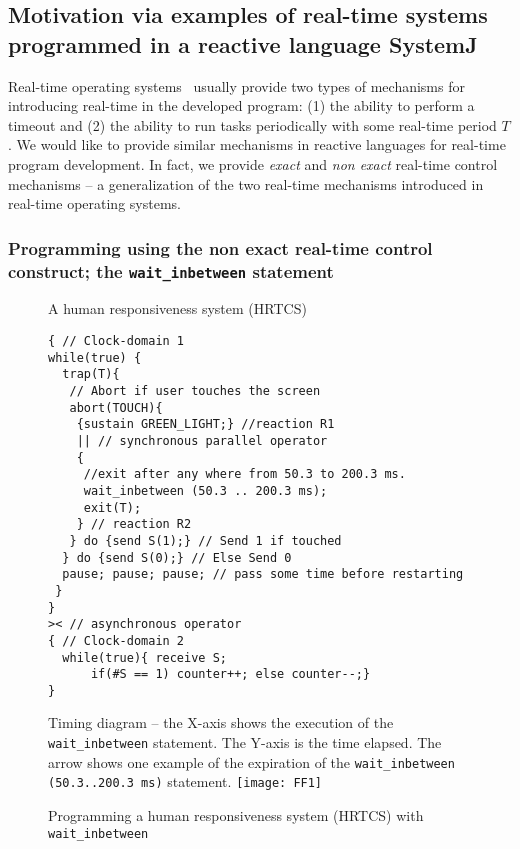 \subsection{Motivation via examples of real-time systems programmed in a
reactive language SystemJ}
\label{sec:motivating-example}


Real-time operating systems~\cite{barry2009using} usually provide two
types of mechanisms for introducing real-time in the developed program:
(1) the ability to perform a timeout and (2) the ability to run tasks
periodically with some real-time period $T$. We would like to provide
similar mechanisms in reactive languages for real-time program
development. In fact, we provide \textit{exact} and \textit{non exact}
real-time control mechanisms -- a generalization of the two real-time
mechanisms introduced in real-time operating systems.

\subsubsection{Programming using the non exact real-time control
  construct; the \textrm{\texttt{wait\_inbetween}} statement}
\label{sec:progr-using-non}

\begin{figure}[t!]
	\vspace{-10pt}
        \begin{SubFloat}{\label{delay:a}A human responsiveness
            system (HRTCS)}
        \begin{lstlisting}[style=sysj,morekeywords={sustain,send,receive,abort,await,emit,present,trap,pause,exit,wait_inbetween,wait_exact,suspend}]
{ // Clock-domain 1
while(true) {
  trap(T){
   // Abort if user touches the screen
   abort(TOUCH){
    {sustain GREEN_LIGHT;} //reaction R1
    || // synchronous parallel operator
    {
     //exit after any where from 50.3 to 200.3 ms.
     wait_inbetween (50.3 .. 200.3 ms); 
     exit(T); 
    } // reaction R2
   } do {send S(1);} // Send 1 if touched 
  } do {send S(0);} // Else Send 0
  pause; pause; pause; // pass some time before restarting
 }
}
>< // asynchronous operator
{ // Clock-domain 2
  while(true){ receive S; 
      if(#S == 1) counter++; else counter--;}
}
\end{lstlisting}
\end{SubFloat}
\begin{SubFloat}{\label{d:b}Timing diagram -- the X-axis shows the
    execution of the \texttt{wait\_inbetween} statement. The Y-axis is
    the time elapsed. The arrow shows one example of the expiration of
    the \mbox{\texttt{wait\_inbetween (50.3..200.3 ms)}} statement.}
    \centering
    \texttt{[image: FF1]}
\end{SubFloat}
\caption{Programming a human responsiveness system (HRTCS) with
  \texttt{wait\_inbetween}}
\label{fig:1}
\end{figure}

